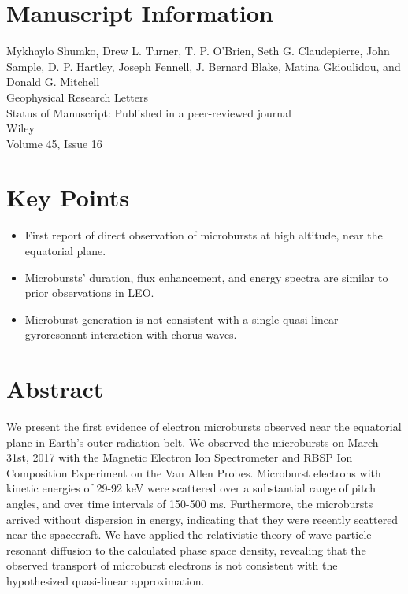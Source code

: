 \newpage

\section{Manuscript Information}

\noindent Mykhaylo Shumko, Drew L. Turner, T. P. O'Brien, Seth G. Claudepierre, John Sample, D. P. Hartley, Joseph Fennell, J. Bernard Blake, Matina Gkioulidou, and Donald G. Mitchell\\
Geophysical Research Letters \\
Status of Manuscript: Published in a peer-reviewed journal \\
Wiley \\
Volume 45, Issue 16

\newpage

\section{Key Points}
\begin{itemize}
\item First report of direct observation of microbursts at high altitude, near the equatorial plane.
\item Microbursts' duration, flux enhancement, and energy spectra are similar to prior observations in LEO.
\item Microburst generation is not consistent with a single quasi-linear gyroresonant interaction with chorus waves.
\end{itemize}

\section{Abstract}
We present the first evidence of electron microbursts observed near the equatorial plane in Earth's outer radiation belt. We observed the microbursts on March 31st, 2017 with the Magnetic Electron Ion Spectrometer and RBSP Ion Composition Experiment on the Van Allen Probes. Microburst electrons with kinetic energies of 29-92 keV were scattered over a substantial range of pitch angles, and over time intervals of 150-500 ms. Furthermore, the microbursts arrived without dispersion in energy, indicating that they were recently scattered near the spacecraft. We have applied the relativistic theory of wave-particle resonant diffusion to the calculated phase space density, revealing that the observed transport of microburst electrons is not consistent with the hypothesized quasi-linear approximation.

